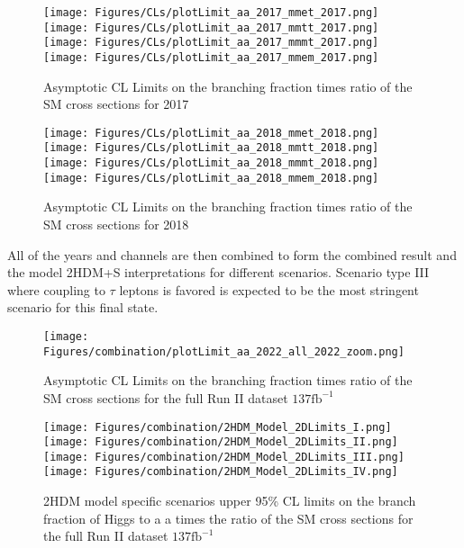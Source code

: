 \begin{figure}[ht!b]
  \centering
  \texttt{[image: Figures/CLs/plotLimit\_aa\_2017\_mmet\_2017.png]}
  \texttt{[image: Figures/CLs/plotLimit\_aa\_2017\_mmtt\_2017.png]}\\
  \texttt{[image: Figures/CLs/plotLimit\_aa\_2017\_mmmt\_2017.png]}
  \texttt{[image: Figures/CLs/plotLimit\_aa\_2017\_mmem\_2017.png]}\\
    \caption{\label{fig:CLs2017} Asymptotic CL Limits on the branching fraction times ratio of the SM cross sections for 2017}
\end{figure}

\begin{figure}[ht!b]
  \centering
  \texttt{[image: Figures/CLs/plotLimit\_aa\_2018\_mmet\_2018.png]}
  \texttt{[image: Figures/CLs/plotLimit\_aa\_2018\_mmtt\_2018.png]}\\
  \texttt{[image: Figures/CLs/plotLimit\_aa\_2018\_mmmt\_2018.png]}
  \texttt{[image: Figures/CLs/plotLimit\_aa\_2018\_mmem\_2018.png]}\\
    \caption{\label{fig:CLs2018} Asymptotic CL Limits on the branching fraction times ratio of the SM cross sections for 2018}
\end{figure}

All of the years and channels are then combined to form the combined result and the model 2HDM+S interpretations for different scenarios. Scenario type III where coupling to $\tau$ leptons is favored is expected to be the most stringent scenario for this final state. 

\begin{figure}[ht!b]
  \texttt{[image: Figures/combination/plotLimit\_aa\_2022\_all\_2022\_zoom.png]}
    \caption{\label{fig:CLsRunII} Asymptotic CL Limits on the branching fraction times ratio of the SM cross sections for the full Run II dataset $\text{137}\text{fb}^{-1}$}
\end{figure}

\begin{figure}[ht!b]
  \centering
  \texttt{[image: Figures/combination/2HDM\_Model\_2DLimits\_I.png]}
  \texttt{[image: Figures/combination/2HDM\_Model\_2DLimits\_II.png]}\\
  \texttt{[image: Figures/combination/2HDM\_Model\_2DLimits\_III.png]}
  \texttt{[image: Figures/combination/2HDM\_Model\_2DLimits\_IV.png]}\\
    \caption{\label{fig:2HDM} 2HDM model specific scenarios upper 95\% CL limits on the branch fraction of Higgs to a a times the ratio of the SM cross sections for the full Run II dataset $\text{137}\text{fb}^{-1}$ }
\end{figure}


